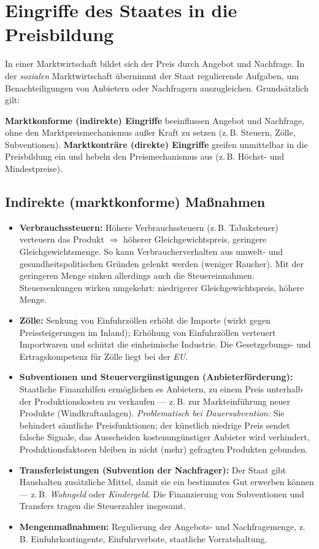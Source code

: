 \documentclass[11pt, a4paper]{article}
\begin{document}
\section{Eingriffe des Staates in die Preisbildung}

In einer Marktwirtschaft bildet sich der Preis durch Angebot und Nachfrage. In der
\emph{sozialen} Marktwirtschaft übernimmt der Staat regulierende Aufgaben, um
Benachteiligungen von Anbietern oder Nachfragern auszugleichen. Grundsätzlich gilt:

\begin{merksatz}
\textbf{Marktkonforme (indirekte) Eingriffe} beeinflussen Angebot und Nachfrage, ohne den
Marktpreismechanismus außer Kraft zu setzen (z.\,B. Steuern, Zölle, Subventionen).
\textbf{Marktkonträre (direkte) Eingriffe} greifen unmittelbar in die Preisbildung ein
und hebeln den Preismechanismus aus (z.\,B. Höchst- und Mindestpreise).
\end{merksatz}

\subsection{Indirekte (marktkonforme) Maßnahmen}

\begin{itemize}
  \item \textbf{Verbrauchssteuern:} Höhere Verbrauchssteuern (z.\,B. Tabaksteuer)
    verteuern das Produkt $\Rightarrow$ höherer Gleichgewichtspreis, geringere
    Gleichgewichtsmenge. So kann Verbraucherverhalten aus umwelt- und
    gesundheitspolitischen Gründen gelenkt werden (weniger Raucher). Mit der geringeren
    Menge sinken allerdings auch die Steuereinnahmen. Steuersenkungen wirken umgekehrt:
    niedrigerer Gleichgewichtspreis, höhere Menge.
  \item \textbf{Zölle:} Senkung von Einfuhrzöllen erhöht die Importe (wirkt gegen
    Preissteigerungen im Inland); Erhöhung von Einfuhrzöllen verteuert Importwaren und
    schützt die einheimische Industrie. Die Gesetzgebungs- und Ertragskompetenz für Zölle
    liegt bei der \emph{EU}.
  \item \textbf{Subventionen und Steuervergünstigungen (Anbieterförderung):} Staatliche
    Finanzhilfen ermöglichen es Anbietern, zu einem Preis unterhalb der
    Produktionskosten zu verkaufen --- z.\,B. zur Markteinführung neuer Produkte
    (Windkraftanlagen). \emph{Problematisch bei Dauersubvention:} Sie behindert sämtliche
    Preisfunktionen; der künstlich niedrige Preis sendet falsche Signale, das Ausscheiden
    kostenungünstiger Anbieter wird verhindert, Produktionsfaktoren bleiben in nicht
    (mehr) gefragten Produkten gebunden.
  \item \textbf{Transferleistungen (Subvention der Nachfrager):} Der Staat gibt Haushalten
    zusätzliche Mittel, damit sie ein bestimmtes Gut erwerben können --- z.\,B.
    \emph{Wohngeld} oder \emph{Kindergeld}. Die Finanzierung von Subventionen und
    Transfers tragen die Steuerzahler insgesamt.
  \item \textbf{Mengenmaßnahmen:} Regulierung der Angebots- und Nachfragemenge, z.\,B.
    Einfuhrkontingente, Einfuhrverbote, staatliche Vorratshaltung.
\end{itemize}
\end{document}
